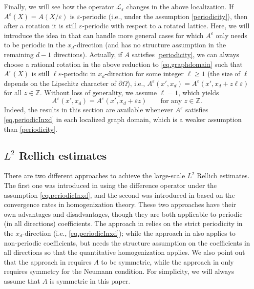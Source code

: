 \documentclass[reqno,12pt]{amsart} %
\theoremstyle{definition}
\theoremstyle{remark}
\numberwithin{equation}{section}
\newcommand{\cL}{\mathcal{L}}
\newcommand{\Z}{\mathbb{Z}}
\newcommand{\e}{\varepsilon}
\begin{document}
Finally, we will see how the operator $\cL_\e$ changes in the above localization. If $A^\e(X) = A(X/\e)$ is $\e$-periodic (i.e., under the assumption \eqref{periodicity}), then after a rotation it is still $\e$-periodic with respect to a rotated lattice. Here, we will introduce the idea in \cite{KS11} that can handle more general cases for which $A^\e$ only needs to be periodic in the $x_d$-direction (and has no structure assumption in the remaining $d-1$ directions). Actually, if $A$ satisfies \eqref{periodicity}, we can always choose a rational rotation in the above reduction to \eqref{eq.graphdomain} such that $A^\e(X)$ is still $\ell \e$-periodic in $x_d$-direction for some integer $\ell \ge 1$ (the size of $\ell$ depends on the Lipschitz character of $\partial \Omega$), i.e., $A^\e(x',x_d) = A^\e(x', x_d + z\ell \e)$ for all $z\in \Z$. Without loss of generality, we assume $\ell = 1$, which yields
\begin{equation}\label{eq.periodicInxd}
    A^\e(x',x_d) = A^\e(x', x_d + \e z ) \qquad \text{for any } z\in \Z.
\end{equation}
Indeed, the results in this section are available whenever $A^\e$ satisfies \eqref{eq.periodicInxd} in each localized graph domain, which is a  weaker assumption than \eqref{periodicity}.

\subsection{$L^2$ Rellich estimates}
\label{subsec.L2Rel}
There are two different approaches to achieve the large-scale $L^2$ Rellich estimates. The first one was introduced in \cite{KS11} using the difference operator under the assumption \eqref{eq.periodicInxd}, and the second was introduced in \cite{Shen17} based on the convergence rates in homogenization theory. These two approaches have their own advantages and disadvantages, though they are both applicable to periodic (in all directions) coefficients. The approach in \cite{KS11} relies on the strict periodicity in the $x_d$-direction (i.e., \eqref{eq.periodicInxd}); while the approach in \cite{Shen17} also applies to non-periodic coefficients, but needs the structure assumption on the coefficients in all directions so that the quantitative homogenization applies.
We also point out that the approach in \cite{KS11} requires $A$ to be symmetric, while the approach in \cite{Shen17} only requires symmetry for the Neumann condition. For simplicity, we will always assume that $A$ is symmetric in this paper.
\end{document}
